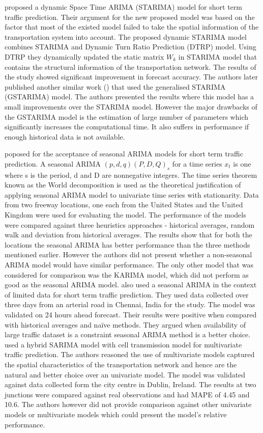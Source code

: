 \citet{min2009short} proposed a dynamic Space Time ARIMA (STARIMA) model for short term traffic
prediction. Their argument for the new proposed model was based on the factor that most of the
existed model failed to take the spatial information of the transportation system into account.
The proposed dynamic STARIMA model combines STARIMA and Dynamic Turn Ratio Prediction (DTRP)
model. Using DTRP they dynamically updated the static matrix $W_{k}$ in STARIMA model that contains
the structural information of the transportation network. The results of the study showed
significant improvement in forecast accuracy. The authors later published another similar work
(\citet{min2010urban}) that used the generalised STARIMA (GSTARIMA) model.  The authors
presented the results where this model has a small improvements over the STARIMA model. However
the major drawbacks of the GSTARIMA model is the estimation of large number of parameters which
significantly increases the computational time. It also suffers in performance if enough historical
data is not available.

\citet{williams2003modeling} poposed for the acceptance of seasonal ARIMA models for short term
traffic prediction. A seasonal ARIMA $(p,d,q) (P,D,Q)_{s}$ for a time series {$x_{t}$} is one
where s is the period, d and D are nonnegative integers. The time series theorem known as the World
decomposition is used as the theoretical justification of applying seasonal ARIMA model to
univariate time series with stationarity. Data from two freeway locations, one each from the
United States and the United Kingdom were used for evaluating the model. The performance of the
models were compared against three heuristics approaches - historical averages, random walk and
deviation from historical averages. The results show that for both the locations the seasonal
ARIMA has better performance than the three methods mentioned earlier. However the authors did
not present whether a non-seasonal ARIMA model would have similar performance. The only other
model that was considered for comparison was the KARIMA model, which did not perform as good as
the seasonal ARIMA model. \citet{kumar2015short} also used a seasonal ARIMA in the context of
limited data for short term traffic prediction. They used data collected over three days from an
arterial road in Chennai, India for the study. The model was validated on 24 hours ahead forecast.
Their results were positive when compared with historical averages and naïve methods. They
argued when availability of large traffic dataset is a constraint seasonal ARIMA method is a
better choice. \citet{szeto2009multivariate} used a hybrid SARIMA model with cell transmission
model for multivariate traffic prediction. The authors reasoned the use of multivariate models
captured the spatial characteristics of the transportation network and hence are the natural
and better choice over an univariate model. The model was validated against data collected form
the city centre in Dublin, Ireland. The results at two junctions were compared against real
observations and had MAPE of 4.45 and 10.6. The authors however did not provide comparison
against other univariate models or multivariate models which could present the model's relative
performance.

